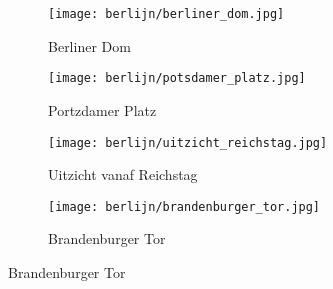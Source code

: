 \begin{figure}[!h]
  \centering
  \begin{subfigure}[h]{0.48\textwidth}
    \texttt{[image: berlijn/berliner\_dom.jpg]}
    \caption{Berliner Dom}
  \end{subfigure}
  \begin{subfigure}[h]{0.48\textwidth}
    \texttt{[image: berlijn/potsdamer\_platz.jpg]}
    \caption{Portzdamer Platz}
  \end{subfigure}
  \begin{subfigure}[h]{0.48\textwidth}
    \texttt{[image: berlijn/uitzicht\_reichstag.jpg]}
    \caption{Uitzicht vanaf Reichstag}
  \end{subfigure}
  \begin{subfigure}[h]{0.48\textwidth}
    \texttt{[image: berlijn/brandenburger\_tor.jpg]}
    \caption{Brandenburger Tor}
  \end{subfigure}
\end{figure}